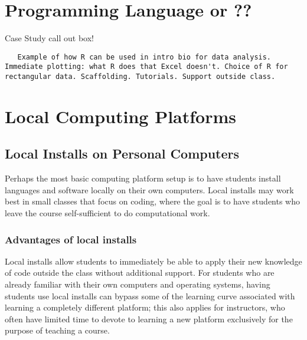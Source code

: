 \section{Programming Language or ??}



{\begin{framed}
Case Study call out box! 
\begin{snugshade*}
\begin{lstlisting}
   Example of how R can be used in intro bio for data analysis. Immediate plotting: what R does that Excel doesn't. Choice of R for rectangular data. Scaffolding. Tutorials. Support outside class.
\end{lstlisting}
\end{snugshade*}
\end{framed}}

\section{Local Computing Platforms}

\subsection{Local Installs on Personal Computers}\label{subsect:Local Installs}

Perhaps the most basic computing platform setup is to have students install languages and software locally on their own computers. 
Local installs may work best in small classes that focus on 
coding, where the goal is to have 
students who leave the course self-sufficient to do computational work.

\subsubsection{Advantages of local installs}

Local installs allow students to immediately be able to apply their new knowledge of code outside the class without additional support. For students who are already familiar with their own computers and operating systems, having students use local installs can bypass some of the learning curve associated with learning a completely different platform; this also applies for instructors, who often have limited time to devote to learning a new platform exclusively for the purpose of teaching a course.

